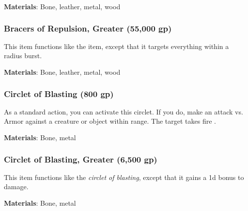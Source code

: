 \vspace{0.25em}
\textbf{Materials}: Bone, leather, metal, wood


\lowercase{\hypertarget{item:Bracers of Repulsion, Greater}{}}\label{item:Bracers of Repulsion, Greater}
\hypertarget{item:Bracers of Repulsion, Greater}{\subsubsection{Bracers of Repulsion, Greater\hfill{} (55,000 gp)}}

This item functions like the  item, except that it targets everything within a \arealarge radius burst.



\vspace{0.25em}
\textbf{Materials}: Bone, leather, metal, wood


\lowercase{\hypertarget{item:Circlet of Blasting}{}}\label{item:Circlet of Blasting}
\hypertarget{item:Circlet of Blasting}{\subsubsection{Circlet of Blasting\hfill{} (800 gp)}}

As a standard action, you can activate this circlet.
If you do, make an attack vs. Armor against a creature or object within \rngmed range.
\hit The target takes fire .



\vspace{0.25em}
\textbf{Materials}: Bone, metal


\lowercase{\hypertarget{item:Circlet of Blasting, Greater}{}}\label{item:Circlet of Blasting, Greater}
\hypertarget{item:Circlet of Blasting, Greater}{\subsubsection{Circlet of Blasting, Greater\hfill{} (6,500 gp)}}

This item functions like the \textit{circlet of blasting}, except that it gains a \plus1d bonus to damage.



\vspace{0.25em}
\textbf{Materials}: Bone, metal


